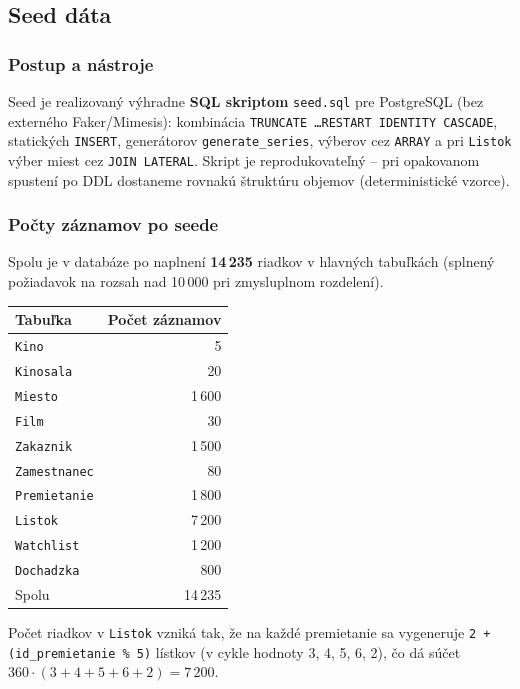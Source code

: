 \documentclass[11pt, a4paper]{article}
\begin{document}
\subsection{Seed dáta}

\subsubsection*{Postup a nástroje}
Seed je realizovaný výhradne \textbf{SQL skriptom} \texttt{seed.sql} pre PostgreSQL (bez externého Faker/Mimesis): kombinácia \texttt{TRUNCATE \ldots RESTART IDENTITY CASCADE}, statických \texttt{INSERT}, generátorov \texttt{generate\_series}, výberov cez \texttt{ARRAY} a pri \texttt{Listok} výber miest cez \texttt{JOIN LATERAL}.
Skript je reprodukovateľný -- pri opakovanom spustení po DDL dostaneme rovnakú štruktúru objemov (deterministické vzorce).

\subsubsection*{Počty záznamov po seede}
Spolu je v databáze po naplnení \textbf{14\,235} riadkov v hlavných tabuľkách (splnený požiadavok na rozsah nad 10\,000 pri zmysluplnom rozdelení).

\begin{tabular}{lr}
    \toprule
    Tabuľka & Počet záznamov \\
    \midrule
    \texttt{Kino} & 5 \\
    \texttt{Kinosala} & 20 \\
    \texttt{Miesto} & 1\,600 \\
    \texttt{Film} & 30 \\
    \texttt{Zakaznik} & 1\,500 \\
    \texttt{Zamestnanec} & 80 \\
    \texttt{Premietanie} & 1\,800 \\
    \texttt{Listok} & 7\,200 \\
    \texttt{Watchlist} & 1\,200 \\
    \texttt{Dochadzka} & 800 \\
    \midrule
    Spolu & 14\,235 \\
    \bottomrule
\end{tabular}

Počet riadkov v \texttt{Listok} vzniká tak, že na každé premietanie sa vygeneruje \texttt{2 + (id\_premietanie \% 5)} lístkov (v cykle hodnoty 3, 4, 5, 6, 2), čo dá súčet $360 \cdot (3{+}4{+}5{+}6{+}2) = 7\,200$.
\end{document}

